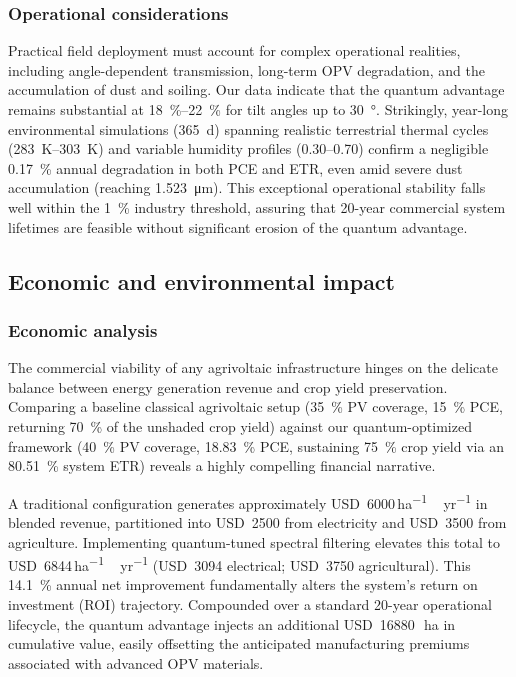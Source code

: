 \subsubsection{Operational considerations}

Practical field deployment must account for complex operational realities, including angle-dependent transmission, long-term OPV degradation, and the accumulation of dust and soiling. Our data indicate that the quantum advantage remains substantial at \SIrange{18}{22}{\percent} for tilt angles up to \SI{30}{\degree}. Strikingly, year-long environmental simulations (\SI{365}{\day}) spanning realistic terrestrial thermal cycles (\SIrange{283}{303}{\kelvin}) and variable humidity profiles (\numrange{0.30}{0.70}) confirm a negligible \SI{0.17}{\percent} annual degradation in both PCE and ETR, even amid severe dust accumulation (reaching \SI{1.523}{\micro\metre}). This exceptional operational stability falls well within the \SI{1}{\percent} industry threshold, assuring that 20-year commercial system lifetimes are feasible without significant erosion of the quantum advantage.

\subsection{Economic and environmental impact}

\subsubsection{Economic analysis}

The commercial viability of any agrivoltaic infrastructure hinges on the delicate balance between energy generation revenue and crop yield preservation. Comparing a baseline classical agrivoltaic setup (\SI{35}{\percent} PV coverage, \SI{15}{\percent} PCE, returning \SI{70}{\percent} of the unshaded crop yield) against our quantum-optimized framework (\SI{40}{\percent} PV coverage, \SI{18.83}{\percent} PCE, sustaining \SI{75}{\percent} crop yield via an \SI{80.51}{\percent} system ETR) reveals a highly compelling financial narrative.

A traditional configuration generates approximately USD~\num{6000}\,\si{ha^{-1}\,yr^{-1}} in blended revenue, partitioned into USD~\num{2500} from electricity and USD~\num{3500} from agriculture. Implementing quantum-tuned spectral filtering elevates this total to USD~\num{6844}\,\si{ha^{-1}\,yr^{-1}} (USD~\num{3094} electrical; USD~\num{3750} agricultural). This \SI{14.1}{\percent} annual net improvement fundamentally alters the system's return on investment (ROI) trajectory. Compounded over a standard 20-year operational lifecycle, the quantum advantage injects an additional USD~\num{16880}\,\si{\per\hectare} in cumulative value, easily offsetting the anticipated manufacturing premiums associated with advanced OPV materials.

